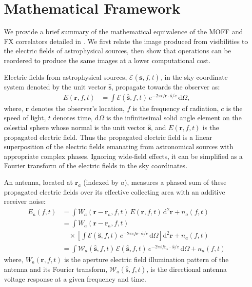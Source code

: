 \documentclass[a4paper,fleqn,usenatbib]{mnras}
\newcommand{\dif}{\mathrm{d}}
\begin{document}
\section{Mathematical Framework}\label{sec:math}

We provide a brief summary of the mathematical equivalence of the MOFF and 
FX correlators detailed in \citet{mor11}. We first relate the image produced 
from visibilities to the electric fields of astrophysical sources, then show that 
operations can be reordered to produce the same images at a lower 
computational cost.

Electric fields from astrophysical sources, $\mathcal{E}(\hat{\mathbf{s}}, f, t)$, in the sky coordinate system denoted by the unit vector $\hat{\mathbf{s}}$, propagate towards the observer as:
\begin{align}
  E(\mathbf{r}, f, t) &= \int \mathcal{E}(\hat{\mathbf{s}},f,t)\,e^{-2\pi i f\mathbf{r}\cdot\hat{\mathbf{s}}/c}\,\dif\Omega,
\end{align}
where, $\mathbf{r}$ denotes the observer's location, $f$ is the frequency of radiation, $c$ is the speed of light, $t$ denotes time, $\dif\Omega$ is the infinitesimal solid angle element on the celestial sphere whose normal is the unit vector $\hat{\mathbf{s}}$, and $E(\mathbf{r}, f, t)$ is the propagated electric field. Thus the propagated electric field is a linear superposition of the electric fields emanating from astronomical sources with appropriate complex phases. Ignoring wide-field effects, it can be simplified as a Fourier transform of the electric fields in the sky coordinates. 

An antenna, located at $\mathbf{r}_a$ (indexed by $a$), measures a phased sum of these propagated electric fields over its effective collecting area with an additive receiver noise:
\begin{align}\label{eqn:measured-E-field}
  E_a(f,t) &= \int W_a(\mathbf{r}-\mathbf{r}_a,f,t)\,E(\mathbf{r},f,t)\,\dif^2\mathbf{r} + n_a(f,t) \\
           &= \int W_a(\mathbf{r}-\mathbf{r}_a,f,t) \nonumber \\
           &\quad \times \left[ \int \mathcal{E}(\hat{\mathbf{s}},f,t)\,e^{-2\pi i f\mathbf{r}\cdot\hat{\mathbf{s}}/c}\,\dif\Omega \right] \dif^2\mathbf{r} + n_a(f,t) \\
           &= \int \mathcal{W}_a(\hat{\mathbf{s}},f,t)\,\mathcal{E}(\hat{\mathbf{s}},f,t)\,e^{-2\pi i f\mathbf{r}_a\!\cdot\,\hat{\mathbf{s}}/c}\,\dif\Omega + n_a(f,t)
\end{align}
where, $W_a(\mathbf{r},f,t)$ is the aperture electric field illumination pattern of the antenna and its Fourier transform, $\mathcal{W}_a(\hat{\mathbf{s}},f,t)$, is the directional antenna voltage response at a given frequency and time.
\end{document}
